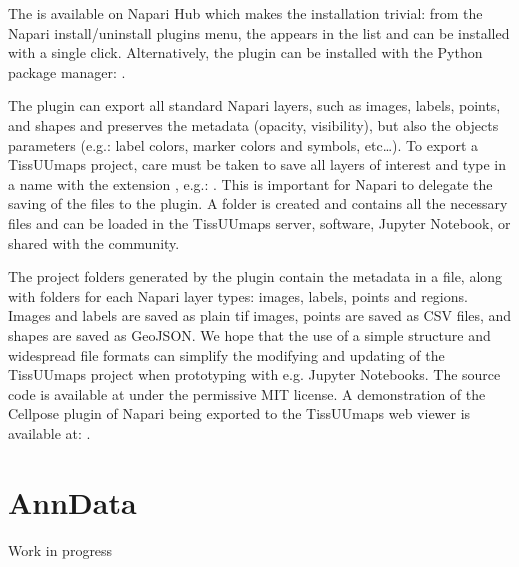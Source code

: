 \documentclass[letterpaper,10pt,english,openany,oneside]{sphinxmanual}
\begin{document}
\sphinxAtStartPar
The  is available on Napari Hub which makes the installation trivial: from the Napari install/uninstall plugins menu, the  appears in the list and can be installed with a single click. Alternatively, the plugin can be installed with the Python package manager: .

\sphinxAtStartPar
The plugin can export all standard Napari layers, such as images, labels, points, and shapes and preserves the metadata (opacity, visibility), but also the objects parameters (e.g.: label colors, marker colors and symbols, etc…). To export a TissUUmaps project, care must be taken to save all layers of interest and type in a name with the extension , e.g.: . This is important for Napari to delegate the saving of the files to the plugin. A folder is created and contains all the necessary files and can be loaded in the TissUUmaps server, software, Jupyter Notebook, or shared with the community.

\sphinxAtStartPar
The project folders generated by the plugin contain the metadata in a  file, along with folders for each Napari layer types: images, labels, points and regions. Images and labels are saved as plain tif images, points are saved as CSV files, and shapes are saved as GeoJSON. We hope that the use of a simple structure and widespread file formats can simplify the modifying and updating of the TissUUmaps project when prototyping with e.g. Jupyter Notebooks.
The source code is available at  under the permissive MIT license.
A demonstration of the Cellpose plugin of Napari being exported to the TissUUmaps web viewer is available at: .

\sphinxstepscope


\section{AnnData}
\label{\detokenize{docs/advanced/anndata:anndata}}\label{\detokenize{docs/advanced/anndata::doc}}
\sphinxAtStartPar
Work in progress

\sphinxstepscope
\end{document}
